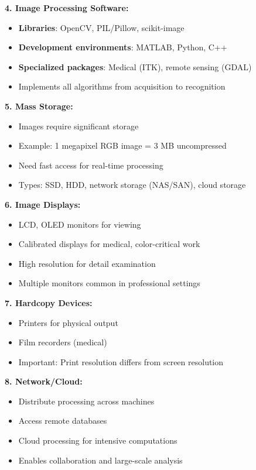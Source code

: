 \documentclass[12pt,a4paper]{article}
\begin{document}
\begin{deepexplanation}
\textbf{4. Image Processing Software:}
\begin{itemize}
    \item \textbf{Libraries}: OpenCV, PIL/Pillow, scikit-image
    \item \textbf{Development environments}: MATLAB, Python, C++
    \item \textbf{Specialized packages}: Medical (ITK), remote sensing (GDAL)
    \item Implements all algorithms from acquisition to recognition
\end{itemize}

\textbf{5. Mass Storage:}
\begin{itemize}
    \item Images require significant storage
    \item Example: 1 megapixel RGB image = 3 MB uncompressed
    \item Need fast access for real-time processing
    \item Types: SSD, HDD, network storage (NAS/SAN), cloud storage
\end{itemize}

\textbf{6. Image Displays:}
\begin{itemize}
    \item LCD, OLED monitors for viewing
    \item Calibrated displays for medical, color-critical work
    \item High resolution for detail examination
    \item Multiple monitors common in professional settings
\end{itemize}

\textbf{7. Hardcopy Devices:}
\begin{itemize}
    \item Printers for physical output
    \item Film recorders (medical)
    \item Important: Print resolution differs from screen resolution
\end{itemize}

\textbf{8. Network/Cloud:}
\begin{itemize}
    \item Distribute processing across machines
    \item Access remote databases
    \item Cloud processing for intensive computations
    \item Enables collaboration and large-scale analysis
\end{itemize}
\end{deepexplanation}
\end{document}
